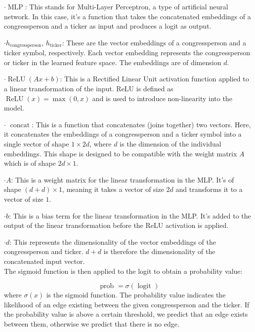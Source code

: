 \documentclass[15pt,letterpaper]{article}
\begin{document}
  $\boldsymbol{\cdot} \operatorname{MLP}$: This stands for Multi-Layer Perceptron, a type of artificial neural network. In this case, it's a function that takes the concatenated embeddings of a congressperson and a ticker as input and produces a logit as output.
  
  $\boldsymbol{\cdot} h_{\text{congressperson}}$, $h_{\text{ticker}}$: These are the vector embeddings of a congressperson and a ticker symbol, respectively. Each vector embedding represents the congressperson or ticker in the learned feature space. The embeddings are of dimension $d$.
  
  $\boldsymbol{\cdot} \operatorname{ReLU}(Ax + b)$: This is a Rectified Linear Unit activation function applied to a linear transformation of the input. ReLU is defined as $\operatorname{ReLU}(x) = \max(0, x)$ and is used to introduce non-linearity into the model.
  
  $\boldsymbol{\cdot}$  $\operatorname{concat}$: This is a function that concatenates (joins together) two vectors. Here, it concatenates the embeddings of a congressperson and a ticker symbol into a single vector of shape $1 \times 2d$, where $d$ is the dimension of the individual embeddings. This shape is designed to be compatible with the weight matrix $A$ which is of shape $2d \times 1$.
  
  $\boldsymbol{\cdot} A$: This is a weight matrix for the linear transformation in the MLP. It's of shape $(d+d) \times 1$, meaning it takes a vector of size $2d$ and transforms it to a vector of size $1$.
  
  $\boldsymbol{\cdot} b$: This is a bias term for the linear transformation in the MLP. It's added to the output of the linear transformation before the ReLU activation is applied.
  
  $\boldsymbol{\cdot} d$: This represents the dimensionality of the vector embeddings of the congressperson and ticker. $d+d$ is therefore the dimensionality of the concatenated input vector.\\
    
The sigmoid function is then applied to the logit to obtain a probability value:

$$
\text { prob }=\sigma(\text { logit })
$$
where $\sigma(x)$ is the sigmoid function. The probability value indicates the likelihood of an edge existing between the given congressperson and the ticker. If the probability value is above a certain threshold, we predict that an edge exists between them, otherwise we predict that there is no edge.
\end{document}
